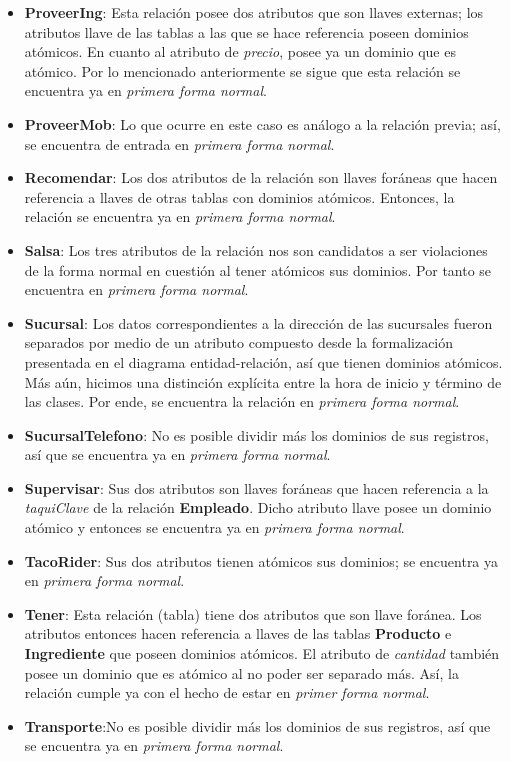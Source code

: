 \documentclass[11pt,letterpaper]{article}
\begin{document}
\begin{itemize}
\item \textbf{ProveerIng}: Esta relación posee dos atributos que son llaves externas; los atributos llave de las tablas a las que se hace referencia poseen dominios atómicos. En cuanto al atributo de \textit{precio}, posee ya un dominio que es atómico. Por lo mencionado anteriormente se sigue que esta relación se encuentra ya en \textit{primera forma normal}.
\item \textbf{ProveerMob}: Lo que ocurre en este caso es análogo a la relación previa; así, se encuentra de entrada en \textit{primera forma normal}.
\item \textbf{Recomendar}: Los dos atributos de la relación son llaves foráneas que hacen referencia a llaves de otras tablas con dominios atómicos. Entonces, la relación se encuentra ya en \textit{primera forma normal}.
\item \textbf{Salsa}: Los tres atributos de la relación nos son candidatos a ser violaciones de la forma normal en cuestión al tener atómicos sus dominios. Por tanto se encuentra en \textit{primera forma normal}. 
\item \textbf{Sucursal}: Los datos correspondientes a la dirección de las sucursales fueron separados por medio de un atributo compuesto desde la formalización presentada en el diagrama entidad-relación, así que tienen dominios atómicos. Más aún, hicimos una distinción explícita entre la hora de inicio y término de las clases. Por ende, se encuentra la relación en \textit{primera forma normal}.

\item \textbf{SucursalTelefono}: No es posible dividir más los dominios de sus registros, así que se encuentra ya en \textit{primera forma normal}.
\item \textbf{Supervisar}: Sus dos atributos son llaves foráneas que hacen referencia a la \textit{taquiClave} de la relación \textbf{Empleado}. Dicho atributo llave posee un dominio atómico y entonces se encuentra ya en \textit{primera forma normal}.
\item \textbf{TacoRider}: Sus dos atributos tienen atómicos sus dominios; se encuentra ya en \textit{primera forma normal}.
\item \textbf{Tener}: Esta relación (tabla) tiene dos atributos que son llave foránea. Los atributos entonces hacen referencia a llaves de las tablas \textbf{Producto} e \textbf{Ingrediente} que poseen dominios atómicos. El atributo de \textit{cantidad} también posee un dominio que es atómico al no poder ser separado más. Así, la relación cumple ya con el hecho de estar en \textit{primer forma normal}.
\item \textbf{Transporte}:No es posible dividir más los dominios de sus registros, así que se encuentra ya en \textit{primera forma normal}.
\end{itemize}
\end{document}
